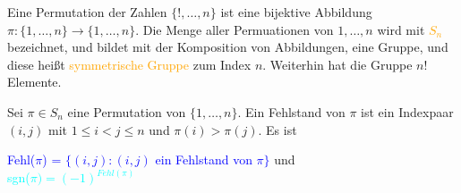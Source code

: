 \begin{definition}
Eine Permutation der Zahlen $\{!, \dots, n\}$ ist eine bijektive Abbildung $\pi:\{1, \dots,n\} \rightarrow \{1, \dots, n\}$. Die Menge aller Permuationen von  $1, \dots,n$ wird mit \textcolor{orange}{$S_{n}$} bezeichnet, und bildet mit der Komposition von Abbildungen, eine Gruppe, und diese heißt \textcolor{orange}{symmetrische Gruppe} zum Index $n$. Weiterhin hat die Gruppe $n!$ Elemente.
\end{definition}
\begin{definition}
Sei $\pi \in S_n$ eine Permutation von $\{1,\dots,n\}$. Ein Fehlstand von $\pi$ ist ein Indexpaar $(i,j)$ mit $1 \leq i < j \leq n$ und $\pi(i) > \pi(j)$. Es ist 
\begin{center}
    \textcolor{blue}{Fehl($\pi$) = $\{(i,j) : (i,j)$ ein Fehlstand von $\pi \}$}      und\\
    \textcolor{cyan}{sgn($\pi) = (-1)^{Fehl(\pi)}$}
\end{center}
\end{definition}
